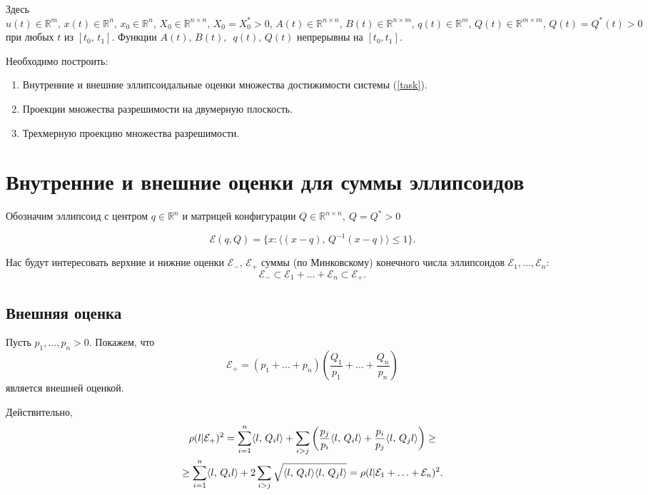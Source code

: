 \documentclass[16pt]{article}
\newcommand\Real{\mathbb{R}}
\newcommand\Sum[2]{\sum\limits_{#1}^{#2}}
\newcommand\Scal[2]{\langle #1,\, #2 \rangle}
\begin{document}
Здесь $u(t) \in \Real^m, \, x(t) \in \Real^n,\, x_0 \in \Real^n, \,X_0 \in \Real^{n \times n},\, X_0 = X_0^* > 0, \, A(t) \in \Real^{n \times n}, \,B(t) \in \Real^{n \times m},\, q(t) \in \Real^m, \, Q(t) \in \Real^{m \times m},\, Q(t) = Q^*(t) > 0 $ при любых $t$ из $[t_0,\, t_1]$. Функции $A(t),\, B(t),\,$ $q(t),\, Q(t)$ непрерывны на $[t_0, t_1].$


Необходимо построить:
\begin{enumerate}
	\item Внутренние и внешние эллипсоидальные оценки множества достижимости системы (\ref{task}).
	\item Проекции множества разрешимости на двумерную плоскость.
	\item Трехмерную проекцию множества разрешимости.
	
\end{enumerate}

\section{Внутренние и внешние оценки для суммы эллипсоидов}

Обозначим эллипсоид с центром $q \in \Real^n$ и матрицей конфигурации $Q \in \Real^{n \times n},\ Q = Q^* > 0$ 

$$\mathcal{E}(q, Q) = \{x\colon \Scal{(x - q)}{Q^{-1}(x - q)} \leq 1\}.$$

Нас будут интересовать верхние и нижние оценки $\mathcal{E}_-,\, \mathcal{E}_+$ суммы (по Минковскому) конечного числа эллипсоидов $\mathcal{E}_1, \ldots, \mathcal{E}_n$:
$$\mathcal{E}_- \subset \mathcal{E}_1 + \ldots + \mathcal{E}_n \subset \mathcal{E}_+.$$

\subsection{Внешняя оценка}
Пусть $p_1, \ldots, p_n > 0$. Покажем, что 
$$\mathcal{E}_+ = (p_1 + \ldots + p_n)\left(\dfrac{Q_1}{p_1} + \ldots + \dfrac{Q_n}{p_n}\right)$$
является внешней оценкой.

Действительно,
\begin{multline}\notag
\rho(l|\mathcal{E}_+)^2 = \Sum{i=1}{n}\Scal{l}{Q_il} + \sum_{i > j} \left(\dfrac{p_j}{p_i}\Scal{l}{Q_il} + \dfrac{p_i}{p_j}\Scal{l}{Q_jl}\right) \geq \\ \geq\Sum{i=1}{n}\Scal{l}{Q_il} + 2\sum_{i > j}\sqrt{\Scal{l}{Q_il}\Scal{l}{Q_jl}} = \rho(l|\mathcal{E}_1 + \ldots + \mathcal{E}_n)^2.
\end{multline}
\end{document}
